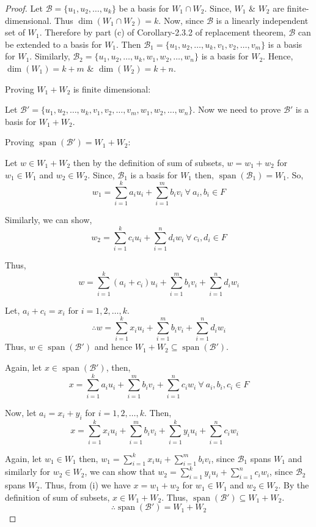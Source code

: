 \documentclass[12pt, a4paper]{article}
\theoremstyle{definition}
\theoremstyle{remark}
\newcommand{\B}{\mathscr{B}}
\DeclareMathOperator{\Span}{span}
\begin{document}
\begin{proof}
    Let $\B = \{u_1, u_2, \dots, u_k\}$ be a basis for $W_1 \cap W_2$. Since, $W_1$ \& $W_2$ are finite-dimensional. Thus $\dim(W_1 \cap W_2) = k$. Now, since $\B$ is a linearly independent set of $W_1$. Therefore by part (c) of Corollary-2.3.2 of replacement theorem, $\B$ can be extended to a basis for $W_1$. Then $\B_1 = \{u_1, u_2, \dots, u_k, v_1, v_2, \dots, v_m\}$ is a basis for $W_1$. Similarly, $\B_2 = \{u_1, u_2, \dots, u_k, w_1, w_2, \dots, w_n\}$ is a basis for $W_2$. Hence, $\dim(W_1) = k+m$ \& $\dim(W_2) = k+n$.

\vspace{3mm}
\noindent Proving $W_1 + W_2$ is finite dimensional:

\noindent Let $\B' = \{u_1, u_2, \dots, u_k, v_1, v_2, \dots, v_m, w_1, w_2, \dots, w_n\}$. Now we need to prove $\B'$ is a basis for $W_1 + W_2$.

\vspace{3mm}
\noindent Proving $\Span(\B') = W_1 + W_2$:

\noindent Let $w \in W_1 + W_2$ then by the definition of sum of subsets, $w = w_1 + w_2$ for $w_1 \in W_1$ and $w_2 \in W_2$.
Since, $\B_1$ is a basis for $W_1$ then, $\Span(\B_1) = W_1$. So,
$$w_1 = \sum_{i=1}^{k} a_i u_i + \sum_{i=1}^{m} b_i v_i \ \forall \ a_i, b_i \in F$$

\noindent Similarly, we can show,
$$w_2 = \sum_{i=1}^{k} c_i u_i + \sum_{i=1}^{n} d_i w_i \ \forall \ c_i, d_i \in F$$

\noindent Thus,
$$w = \sum_{i=1}^{k} (a_i + c_i) u_i + \sum_{i=1}^{m} b_i v_i + \sum_{i=1}^{n} d_i w_i$$

\noindent Let, $a_i + c_i = x_i$ for $i=1, 2, \dots, k$.
$$\therefore w = \sum_{i=1}^{k} x_i u_i + \sum_{i=1}^{m} b_i v_i + \sum_{i=1}^{n} d_i w_i$$
Thus, $w \in \Span(\B')$ and hence $W_1 + W_2 \subseteq \Span(\B')$.

Again, let $x \in \Span(\B')$, then,
$$x = \sum_{i=1}^{k} a_i u_i + \sum_{i=1}^{m} b_i v_i + \sum_{i=1}^{n} c_i w_i \ \forall \ a_i, b_i, c_i \in F$$

\noindent Now, let $a_i = x_i + y_i$ for $i=1, 2, \dots, k$. Then,
\[x = \sum_{i=1}^{k} x_i u_i + \sum_{i=1}^{m} b_i v_i + \sum_{i=1}^{k} y_i u_i + \sum_{i=1}^{n} c_i w_i \quad \tag{i}\]

\noindent Again, let $w_1 \in W_1$ then, $w_1 = \displaystyle\sum_{i=1}^{k} x_i u_i + \displaystyle\sum_{i=1}^{m} b_i v_i$, since $\B_1$ spans $W_1$ and similarly for $w_2 \in W_2$, we can show that $w_2 = \displaystyle\sum_{i=1}^{k} y_i u_i + \displaystyle\sum_{i=1}^{n} c_i w_i$, since $\B_2$ spans $W_2$. Thus, from (i) we have $x = w_1 + w_2$ for $w_1 \in W_1$ and $w_2 \in W_2$. By the definition of sum of subsets, $x \in W_1 + W_2$. Thus, $\Span(\B') \subseteq W_1 + W_2$.
$$\therefore \Span(\B') = W_1 + W_2$$


\end{proof}
\end{document}
